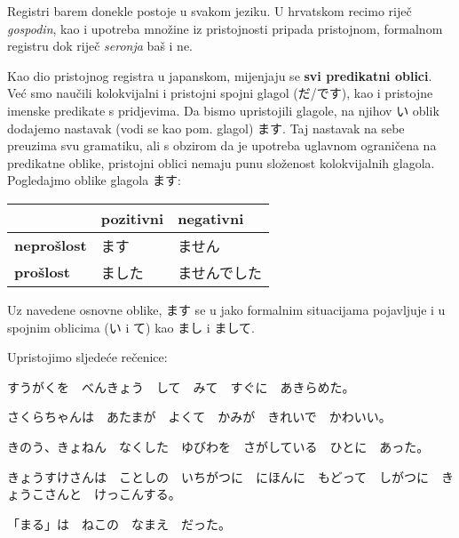 	
	Registri barem donekle postoje u svakom jeziku. U hrvatskom recimo riječ \textit{gospodin}, kao i upotreba množine iz pristojnosti pripada pristojnom, formalnom registru dok riječ \textit{seronja} baš i ne.
	
	\newpage
	
	Kao dio pristojnog registra u japanskom, mijenjaju se \textbf{svi predikatni oblici}\footnotemark[1]. Već smo naučili kolokvijalni i pristojni spojni glagol (だ/です), kao i pristojne imenske predikate s pridjevima. Da bismo upristojili glagole, na njihov い oblik dodajemo nastavak (vodi se kao pom. glagol) ます. Taj nastavak na sebe preuzima svu gramatiku, ali s obzirom da je upotreba uglavnom ograničena na predikatne oblike, pristojni oblici nemaju punu složenost kolokvijalnih glagola. Pogledajmo oblike glagola ます:
	
	\vspace{10pt}
	\begin{tabular}{|l|l|l|}
		\hline
		&\textbf{pozitivni}&\textbf{negativni}\\
		\hline
		\textbf{neprošlost}&ます&ません\\
		\hline
		\textbf{prošlost}&ました&ませんでした\\
		\hline
	\end{tabular}

	\vspace{10pt}
	Uz navedene osnovne oblike, ます se u jako formalnim situacijama pojavljuje i u spojnim oblicima (い i て) kao まし i まして.
	
	
	\begin{reibun}
	\end{reibun}
	
	\begin{reibun}
	\end{reibun}

	
	\begin{mondai}{Upristojimo sljedeće rečenice:}
		\item すうがくを　べんきょう　して　みて　すぐに　あきらめた。
		\item さくらちゃんは　あたまが　よくて　かみが　きれいで　かわいい。
		\item きのう、きょねん　なくした　ゆびわを　さがしている　ひとに　あった。
		\item きょうすけさんは　ことしの　いちがつに　にほんに　もどって　しがつに　きょうこさんと　けっこんする。
		\item 「まる」は　ねこの　なまえ　だった。
	\end{mondai}
